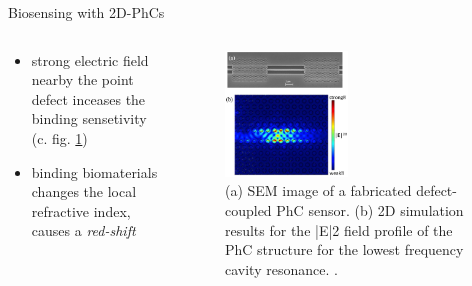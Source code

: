 \begin{frame}{Biosensing with 2D-PhCs}
  \begin{columns}

  \begin{column}{0.49\textwidth}
    \begin{itemize}
      \setlength\itemsep{1.2em}
      \item{strong electric field nearby the point defect inceases the binding sensetivity (c. fig. \ref{fig: e_field})}
      \item{binding biomaterials changes the local refractive index, causes a \emph{red-shift}}
    \end{itemize}
  \end{column}

  \begin{column}{0.49\textwidth}
    \begin{figure}
      \centering
      \includegraphics[width=0.5\textwidth]{./bilder/multiplexing_photon.jpg}
      \caption{(a) SEM image of a fabricated defect-coupled PhC sensor. (b) 2D simulation results for the |E|2 field profile of the PhC structure for the lowest frequency cavity resonance.
                \cite{test_Structure}.}
      \label{fig: e_field}
    \end{figure}
  \end{column}

\end{columns}
\end{frame}



